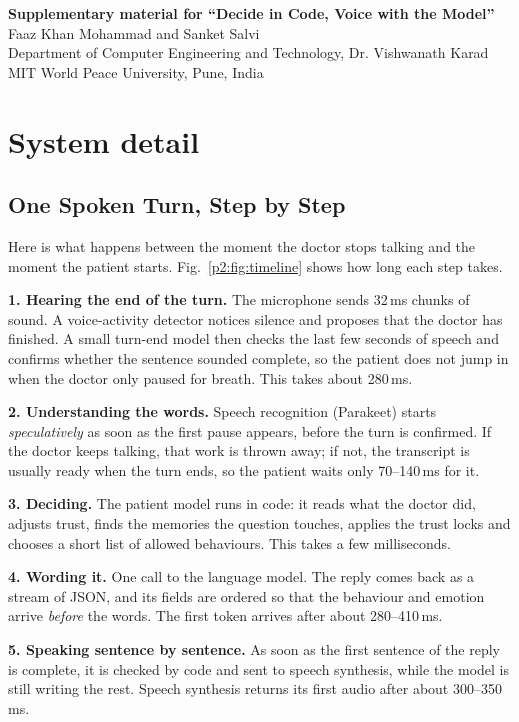 \documentclass[10pt]{article}
\begin{document}
\begin{center}{\Large\bfseries Supplementary material for ``Decide in Code, Voice with the Model''}\\[2mm]Faaz Khan Mohammad and Sanket Salvi\\Department of Computer Engineering and Technology, Dr. Vishwanath Karad MIT World Peace University, Pune, India\end{center}
\section{System detail}\label{s:system}

\subsection{One Spoken Turn, Step by Step}
Here is what happens between the moment the doctor stops talking and the moment the patient starts. Fig.~\ref{p2:fig:timeline} shows how long
each step takes.

\textbf{1. Hearing the end of the turn.} The microphone sends 32\,ms chunks of sound. A voice-activity detector notices silence and proposes
that the doctor has finished. A small turn-end model then checks the last few seconds of speech and confirms whether the sentence sounded
complete, so the patient does not jump in when the doctor only paused for breath. This takes about 280\,ms.

\textbf{2. Understanding the words.} Speech recognition (Parakeet) starts \emph{speculatively} as soon as the first pause appears, before the
turn is confirmed. If the doctor keeps talking, that work is thrown away; if not, the transcript is usually ready when the turn ends, so the
patient waits only 70--140\,ms for it.

\textbf{3. Deciding.} The patient model runs in code: it reads what the doctor did, adjusts trust, finds the memories the question touches,
applies the trust locks and chooses a short list of allowed behaviours. This takes a few milliseconds.

\textbf{4. Wording it.} One call to the language model. The reply comes back as a stream of JSON, and its fields are ordered so that the
behaviour and emotion arrive \emph{before} the words. The first token arrives after about 280--410\,ms.

\textbf{5. Speaking sentence by sentence.} As soon as the first sentence of the reply is complete, it is checked by code and sent to speech
synthesis, while the model is still writing the rest. Speech synthesis returns its first audio after about 300--350\,ms.
\end{document}
